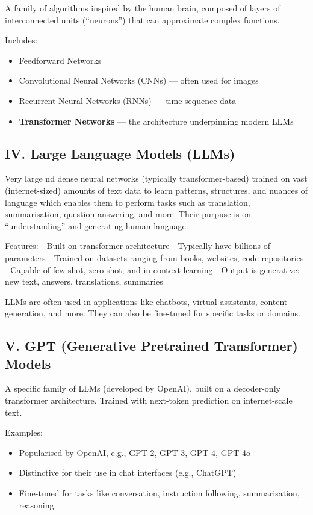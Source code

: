 \documentclass[
  10t,
]{article}
\providecommand{\tightlist}{%
  \setlength{\itemsep}{0pt}\setlength{\parskip}{0pt}}
\begin{document}
A family of algorithms inspired by the human brain, composed of layers
of interconnected units (``neurons'') that can approximate complex
functions.

Includes:

\begin{itemize}
\tightlist
\item
  Feedforward Networks
\item
  Convolutional Neural Networks (CNNs) --- often used for images
\item
  Recurrent Neural Networks (RNNs) --- time-sequence data
\item
  \textbf{Transformer Networks} --- the architecture underpinning modern
  LLMs
\end{itemize}

\subsection{IV. Large Language Models
(LLMs)}\label{iv.-large-language-models-llms}

Very large nd dense neural networks (typically transformer-based)
trained on vast (internet-sized) amounts of text data to learn patterns,
structures, and nuances of language which enables them to perform tasks
such as translation, summarisation, question answering, and more. Their
purpuse is on ``understanding'' and generating human language.

Features: - Built on transformer architecture - Typically have billions
of parameters - Trained on datasets ranging from books, websites, code
repositories - Capable of few-shot, zero-shot, and in-context learning -
Output is generative: new text, answers, translations, summaries

LLMs are often used in applications like chatbots, virtual assistants,
content generation, and more. They can also be fine-tuned for specific
tasks or domains.

\subsection{V. GPT (Generative Pretrained Transformer)
Models}\label{v.-gpt-generative-pretrained-transformer-models}

A specific family of LLMs (developed by OpenAI), built on a decoder-only
transformer architecture. Trained with next-token prediction on
internet-scale text.

Examples:

\begin{itemize}
\tightlist
\item
  Popularised by OpenAI, e.g., GPT-2, GPT-3, GPT-4, GPT-4o
\item
  Distinctive for their use in chat interfaces (e.g., ChatGPT)
\item
  Fine-tuned for tasks like conversation, instruction following,
  summarisation, reasoning
\end{itemize}
\end{document}
